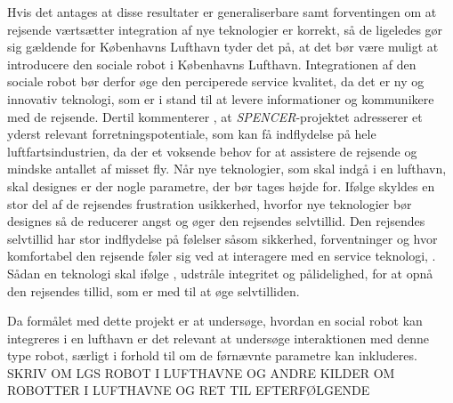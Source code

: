 Hvis det antages at disse resultater er generaliserbare samt forventingen om at rejsende værtsætter integration af nye teknologier er korrekt, så de ligeledes gør sig gældende for Københavns Lufthavn tyder det på, at det bør være muligt at introducere den sociale robot i Københavns Lufthavn. Integrationen af den sociale robot bør derfor øge den perciperede service kvalitet, da det er ny og innovativ teknologi, som er i stand til at levere informationer og kommunikere med de rejsende. Dertil kommenterer \textcite[s. 609]{PDF:SpencerProject}, at \textit{SPENCER}-projektet adresserer et yderst relevant forretningspotentiale, som kan få indflydelse på hele luftfartsindustrien, da der et voksende behov for at assistere de rejsende og mindske antallet af misset fly.\blankline
%
Når nye teknologier, som skal indgå i en lufthavn, skal designes er der nogle parametre, der bør tages højde for. Ifølge \textcite[s. 352]{PDF:TheImpactOfTraveler} skyldes en stor del af de rejsendes frustration usikkerhed, hvorfor nye teknologier bør designes så de reducerer angst og øger den rejsendes selvtillid. Den rejsendes selvtillid har stor indflydelse på følelser såsom sikkerhed, forventninger og hvor komfortabel den rejsende føler sig ved at interagere med en service teknologi, \parencite[s. 353]{PDF:TheImpactOfTraveler}. Sådan en teknologi skal ifølge \textcite[s. 353]{PDF:TheImpactOfTraveler}, udstråle integritet og pålidelighed, for at opnå den rejsendes tillid, som er med til at øge selvtilliden.

Da formålet med dette projekt er at undersøge, hvordan en social robot kan integreres i en lufthavn er det relevant at undersøge interaktionen med denne type robot, særligt i forhold til om de førnævnte parametre kan inkluderes. \blankline
%
SKRIV OM LGS ROBOT I LUFTHAVNE OG ANDRE KILDER OM ROBOTTER I LUFTHAVNE OG RET TIL EFTERFØLGENDE\blankline
%


